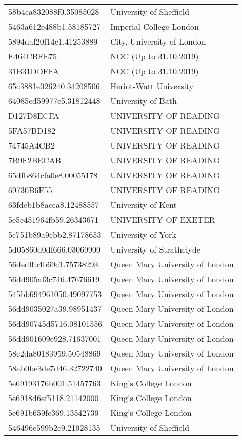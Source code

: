 \begin{tabular}{ll}
58b4ca832088f0.35085028 & University of Sheffield \\
5463a612e488b1.58185727 & Imperial College London \\
5894daf20f14c1.41253889 & City, University of London \\
E464CBFE75 & NOC (Up to 31.10.2019) \\
31B31DDFFA & NOC (Up to 31.10.2019) \\
65c3881e026240.34208506 & Heriot-Watt University \\
64085cd59977e5.31812448 & University of Bath \\
D127D8ECFA & UNIVERSITY OF READING \\
5FA57BD182 & UNIVERSITY OF READING \\
74745A4CB2 & UNIVERSITY OF READING \\
7B9F2BECAB & UNIVERSITY OF READING \\
65dfb864cfa0e8.00055178 & UNIVERSITY OF READING \\
69730B6F55 & UNIVERSITY OF READING \\
63fdeb1b8acca8.12488557 & University of Kent \\
5e5e451964fb59.26343671 & UNIVERSITY OF EXETER \\
5c751b89a9cbb2.87178653 & University of York \\
5d05860d0df666.03069900 & University of Strathclyde \\
56dedffb4b69c1.75738293 & Queen Mary University of London \\
56dd905af3c746.47676619 & Queen Mary University of London \\
545bb694961050.49097753 & Queen Mary University of London \\
56dd9035027a39.98951437 & Queen Mary University of London \\
56dd90745d5716.08101556 & Queen Mary University of London \\
56dd901609e928.71637001 & Queen Mary University of London \\
58c2da80183959.50548869 & Queen Mary University of London \\
58ab0be3de7d46.32722740 & Queen Mary University of London \\
5e69193176b001.51457763 & King's College London \\
5e6918d6ef5118.21142000 & King's College London \\
5e691b659fe369.13542739 & King's College London \\
546496e599b2c9.21928135 & University of Sheffield \\

\end{tabular}
